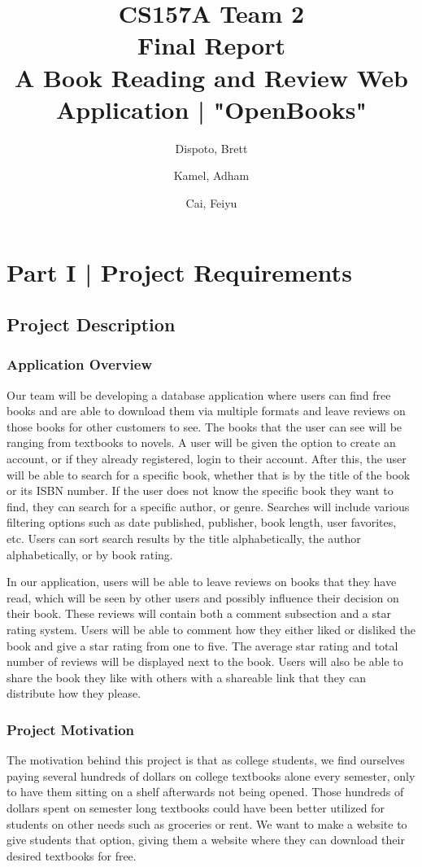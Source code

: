 \documentclass[letter, 12pt, titlepage]{article}
\author{
	Dispoto, Brett\\
        \and
        Kamel, Adham\\
        \and
        Cai, Feiyu\\
}
\title{CS157A Team 2 \\ Final Report\\
        \large A Book Reading and Review Web Application | "OpenBooks"}
\begin{document}
\maketitle
\section{Part I | Project Requirements}
\subsection{Project Description}
        \subsubsection{Application Overview}
        Our team will be developing a database application where users can find free books and are able to download them via multiple formats and leave reviews on those books for other customers to see. The books that the user can see will be ranging from textbooks to novels. A user will be given the option to create an account, or if they already registered, login to their account. After this, the user will be able to search for a specific book, whether that is by the title of the book or its ISBN number. If the user does not know the specific book they want to find, they can search for a specific author, or genre. Searches will include various filtering options such as date published, publisher, book length, user favorites, etc. Users can sort search results by the title alphabetically, the author alphabetically, or by book rating.

\medskip
        In our application, users will be able to leave reviews on books that they have read, which will be seen by other users and possibly influence their decision on their book. These reviews will contain both a comment subsection and a star rating system. Users will be able to comment how they either liked or disliked the book and give a star rating from one to five. The average star rating and total number of reviews will be displayed next to the book. Users will also be able to share the book they like with others with a shareable link that they can distribute how they please.
	\subsubsection{Project Motivation}
	The motivation behind this project is that as college students, we find ourselves paying several hundreds of dollars on college textbooks alone every semester, only to have them sitting on a shelf afterwards not being opened. Those hundreds of dollars spent on semester long textbooks could have been better utilized for students on other needs such as groceries or rent. We want to make a website to give students that option, giving them a website where they can download their desired textbooks for free.
\end{document}
